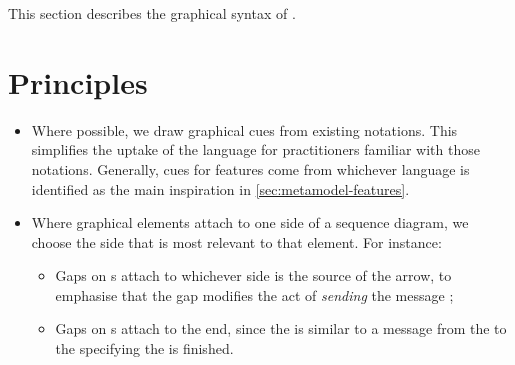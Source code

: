 This section describes the graphical syntax of \langname.


\section{Principles}


\begin{itemize}
\item Where possible, we draw graphical cues from existing notations.
  This simplifies the uptake of the language for practitioners
  familiar with those notations.  Generally, cues for features come
  from whichever language is identified as the main inspiration in
  \cref{sec:metamodel-features}.
\item Where graphical elements attach to one side of a sequence diagram,
  we choose the side that is most relevant to that element.  For instance:
  \begin{itemize}
  \item Gaps on \marrowaction s attach to whichever
    side is the source of the arrow, to emphasise that the gap modifies
    the act of \emph{sending} the message ;
  \item Gaps on \mfinalaction s attach to the \mtarget{} end,
    since the \mfinalaction{} is similar to a message from the \mtarget{} to
    the \mworld{} specifying the \mtarget{} is finished.
  \end{itemize}
\end{itemize}

